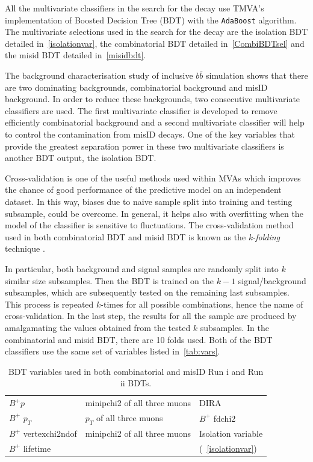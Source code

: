All the multivariate classifiers in the search for the \Bmumumu decay use TMVA's \cite{Speckmayer:2010zz} implementation of Boosted Decision Tree (BDT) with the \texttt{AdaBoost} algorithm. The multivariate selections used in the search for the \Bmumumu decay are the isolation BDT detailed in~\autoref{isolationvar}, the combinatorial BDT detailed in~\autoref{CombiBDTsel} and the misid BDT detailed in~\autoref{misidbdt}.

The background characterisation study of inclusive $b\bar{b}$ simulation shows that there are two dominating backgrounds, combinatorial background and misID background. In order to reduce these backgrounds, two consecutive multivariate classifiers are used. The first multivariate classifier is developed to remove efficiently combinatorial background and a second multivariate classifier will help to control the contamination from misID decays. One of the key variables that provide the greatest separation power in these two multivariate classifiers is another BDT output, the isolation BDT.

Cross-validation is one of the useful methods used within MVAs which improves the chance of good performance of the predictive model on an independent dataset. In this way, biases due to naive sample split into training and testing subsample, could be overcome. In general, it helps also with overfitting when the model of the classifier is sensitive to fluctuations.  The cross-validation method used in both combinatorial BDT and misid BDT is known as the \textit{k-folding} technique \cite{kfold}. 

In particular, both background and signal samples are randomly split into $k$ similar size subsamples. Then the BDT is trained on the $k-1$ signal/background subsamples, which are subsequently tested on the remaining last subsamples. This process is repeated $k$-times for all possible combinations, hence the name of cross-validation. In the last step, the results for all the sample are produced by amalgamating the values obtained from the tested $k$ subsamples. In the combinatorial and misid BDT, there are 10 folds used. Both of the BDT classifiers use the same set of variables listed in~\autoref{tab:vars}.

\begin{table}[h!]
\begin{center}
\begin{tabular}{| l  l  l |} \hline
$B^{+} p$ & \gls{minipchi2} of all three muons & \gls{DIRA} \\
$B^{+}$ $p_T$ & $p_{T}$ of all three muons & $B^{+}$ \gls{fdchi2} \\ 
$B^{+}$ \gls{vertexchi2ndof} & \gls{minipchi2} of all three muons  & Isolation variable \\
	$B^{+}$ lifetime &  & (~\autoref{isolationvar}) \\ \hline
\end{tabular}
\end{center}
\caption{BDT variables used in both combinatorial and misID Run \Rn{1} and Run \Rn{2} BDTs.}
\label{tab:vars}
\end{table}



